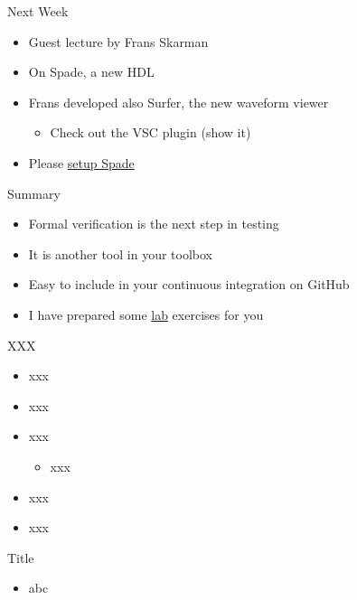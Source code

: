 \begin{frame}[fragile]{Next Week}
\begin{itemize}
\item Guest lecture by Frans Skarman
\item On Spade, a new HDL
\item Frans developed also Surfer, the new waveform viewer
\begin{itemize}
\item Check out the VSC plugin (show it)
\end{itemize}
\item Please \href{https://docs.spade-lang.org/agile/quick_setup.html}{setup Spade}
\end{itemize}
\end{frame}

\begin{frame}[fragile]{Summary}
\begin{itemize}
\item Formal verification is the next step in testing
\item It is another tool in your toolbox
\item Easy to include in your continuous integration on GitHub
\item I have prepared some \href{https://github.com/schoeberl/agile-hw/tree/main/lab8}{lab} exercises for you
\end{itemize}
\end{frame}




\begin{frame}[fragile]{XXX}
\begin{itemize}
\item xxx
\item xxx
\item xxx
\begin{itemize}
\item xxx
\end{itemize}
\item xxx
\item xxx
\end{itemize}
\end{frame}

\begin{frame}[fragile]{Title}
\begin{itemize}
\item abc
\end{itemize}
\end{frame}
